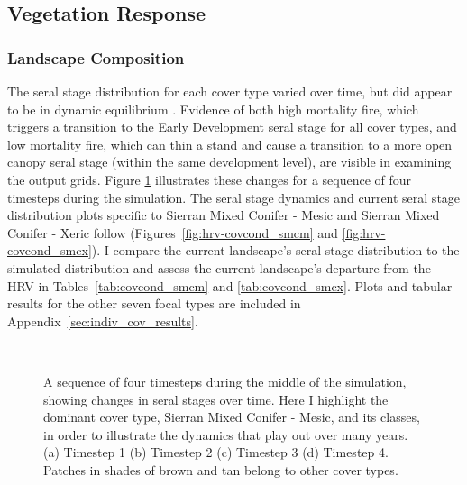 \clearpage



\subsection{Vegetation Response}
\label{subsec:HRVvegresponse}


\subsubsection{Landscape Composition} 

The seral stage distribution for each cover type varied over time, but did appear to be in dynamic equilibrium \citep{Diamond1969}. Evidence of both high mortality fire, which triggers a transition to the Early Development seral stage for all cover types, and low mortality fire, which can thin a stand and cause a transition to a more open canopy seral stage (within the same development level), are visible in examining the output grids. Figure \ref{fig:covcondmaps} illustrates these changes for a sequence of four timesteps during the simulation. The seral stage dynamics and current seral stage distribution plots specific to Sierran Mixed Conifer - Mesic and Sierran Mixed Conifer - Xeric follow (Figures~\ref{fig:hrv-covcond_smcm} and \ref{fig:hrv-covcond_smcx}). I compare the current landscape's seral stage distribution to the simulated distribution and assess the current landscape's departure from the HRV in Tables~\ref{tab:covcond_smcm} and \ref{tab:covcond_smcx}. Plots and tabular results for the other seven focal types are included in Appendix~\ref{sec:indiv_cov_results}.

\begin{figure}[!htbp]
  \centering
  \\%
  \caption{A sequence of four timesteps during the middle of the simulation, showing changes in seral stages over time. Here I highlight the dominant cover type, Sierran Mixed Conifer - Mesic, and its classes, in order to illustrate the dynamics that play out over many years. (a) Timestep 1 (b) Timestep 2 (c) Timestep 3 (d) Timestep 4. Patches in shades of brown and tan belong to other cover types.}
  \label{fig:covcondmaps}
\end{figure}


